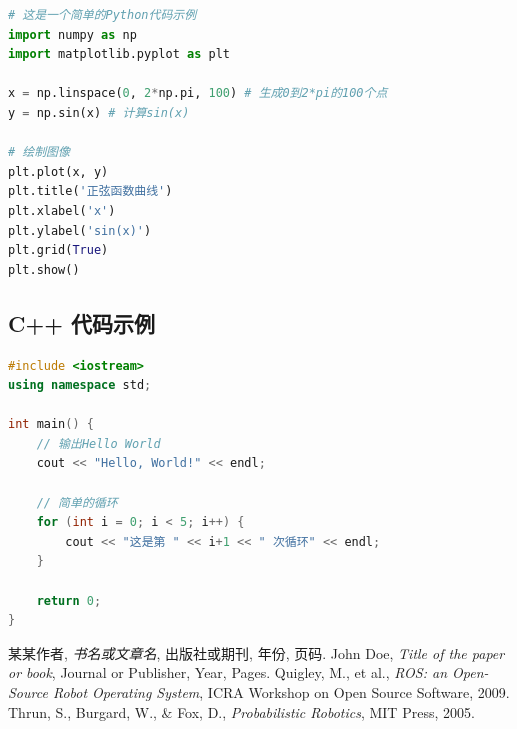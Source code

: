 \documentclass[a4paper]{article}
\begin{document}
\begin{lstlisting}[language=Python, caption={Python 代码示例}, label={code:python_example}]
# 这是一个简单的Python代码示例
import numpy as np
import matplotlib.pyplot as plt

x = np.linspace(0, 2*np.pi, 100) # 生成0到2*pi的100个点
y = np.sin(x) # 计算sin(x)

# 绘制图像
plt.plot(x, y)
plt.title('正弦函数曲线')
plt.xlabel('x')
plt.ylabel('sin(x)')
plt.grid(True)
plt.show()
\end{lstlisting}

\subsection{C++ 代码示例}

\begin{lstlisting}[language=C++, caption={C++ 代码示例}, label={code:cpp_example}]
#include <iostream>
using namespace std;

int main() {
    // 输出Hello World
    cout << "Hello, World!" << endl;

    // 简单的循环
    for (int i = 0; i < 5; i++) {
        cout << "这是第 " << i+1 << " 次循环" << endl;
    }

    return 0;
}
\end{lstlisting}



\newpage
\begin{thebibliography}{9}
 某某作者, \emph{书名或文章名}, 出版社或期刊, 年份, 页码.
 John Doe, \emph{Title of the paper or book}, Journal or Publisher, Year, Pages.
 Quigley, M., et al., \emph{ROS: an Open-Source Robot Operating System}, ICRA Workshop on Open Source Software, 2009.
 Thrun, S., Burgard, W., \& Fox, D., \emph{Probabilistic Robotics}, MIT Press, 2005.
\end{thebibliography}
\end{document}
